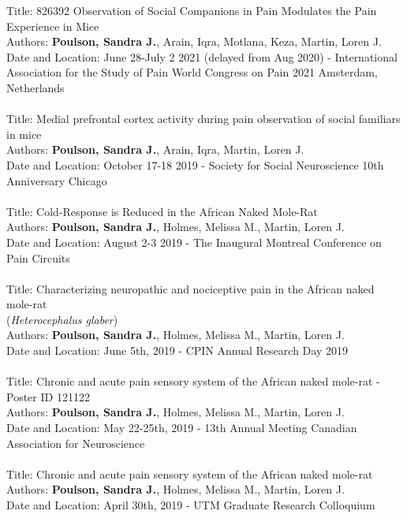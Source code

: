 \documentclass[letterpaper]{article}
\renewenvironment{itemize}{
  \begin{list}{}{
    \setlength{\leftmargin}{1.5em}
  }
}{
  \end{list}
}
\begin{document}
\begin{itemize}
\item 
Title: 826392 Observation of Social Companions in Pain Modulates the Pain Experience in Mice \\
Authors: \textbf {Poulson, Sandra J.}, Arain, Iqra, Motlana, Keza, Martin, Loren J. \\
Date and Location: June 28-July 2 2021 (delayed from Aug 2020) - International Association for the Study of Pain World Congress on Pain 2021 Amsterdam, Netherlands \\
\\
Title: Medial prefrontal cortex activity during pain observation of social familiars in mice \\
Authors: \textbf {Poulson, Sandra J.}, Arain, Iqra, Martin, Loren J. \\
Date and Location: October 17-18 2019 - Society for Social Neuroscience 10th Anniversary Chicago \\
\\
Title: Cold-Response is Reduced in the African Naked Mole-Rat \\
Authors: \textbf {Poulson, Sandra J.}, Holmes, Melissa M., Martin, Loren J. \\
Date and Location: August 2-3 2019 - The Inaugural Montreal Conference on Pain Circuits \\
\\
Title: Characterizing neuropathic and nociceptive pain in the African naked mole-rat\\ (\textit{Heterocephalus glaber}) \\
Authors: \textbf {Poulson, Sandra J.}, Holmes, Melissa M., Martin, Loren J. \\
Date and Location: June 5th, 2019 - CPIN Annual Research Day 2019 \\
\\
Title: Chronic and acute pain sensory system of the African naked mole-rat - Poster ID 121122 \\
Authors: \textbf {Poulson, Sandra J.}, Holmes, Melissa M., Martin, Loren J. \\
Date and Location: May 22-25th, 2019 - 13th Annual Meeting Canadian Association for Neuroscience \\
\\
Title: Chronic and acute pain sensory system of the African naked mole-rat\\
Authors: \textbf {Poulson, Sandra J.}, Holmes, Melissa M., Martin, Loren J. \\
Date and Location: April 30th, 2019 - UTM Graduate Research Colloquium \\

\end{itemize}
\end{document}
